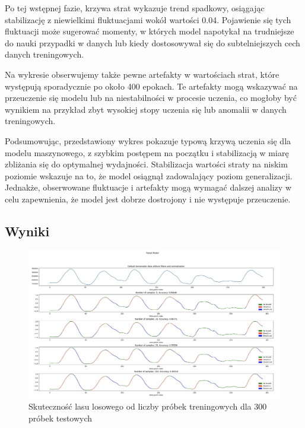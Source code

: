\documentclass{article}
\begin{document}
Po tej wstępnej fazie, krzywa strat wykazuje trend spadkowy, osiągając stabilizację z niewielkimi fluktuacjami wokół wartości 0.04. Pojawienie się tych fluktuacji może sugerować momenty, w których model napotykał na trudniejsze do nauki przypadki w danych lub kiedy dostosowywał się do subtelniejszych cech danych treningowych.

Na wykresie obserwujemy także pewne artefakty w wartościach strat, które występują sporadycznie po około 400 epokach. Te artefakty mogą wskazywać na przeuczenie się modelu lub na niestabilności w procesie uczenia, co mogłoby być wynikiem na przykład zbyt wysokiej stopy uczenia się lub anomalii w danych treningowych.

Podsumowując, przedstawiony wykres pokazuje typową krzywą uczenia się dla modelu maszynowego, z szybkim postępem na początku i stabilizacją w miarę zbliżania się do optymalnej wydajności. Stabilizacja wartości straty na niskim poziomie wskazuje na to, że model osiągnął zadowalający poziom generalizacji. Jednakże, obserwowane fluktuacje i artefakty mogą wymagać dalszej analizy w celu zapewnienia, że model jest dobrze dostrojony i nie występuje przeuczenie.


\subsection{Wyniki}

\begin{figure}[H]
    \centering
    \includegraphics[width=\textwidth]{las_losowy/jak_sobie_radzi_las_losowy.png}
    \caption{Skuteczność lasu losowego od liczby próbek treningowych dla 300 próbek testowych}
    \label{fig:data_chart3}
\end{figure}
\end{document}
